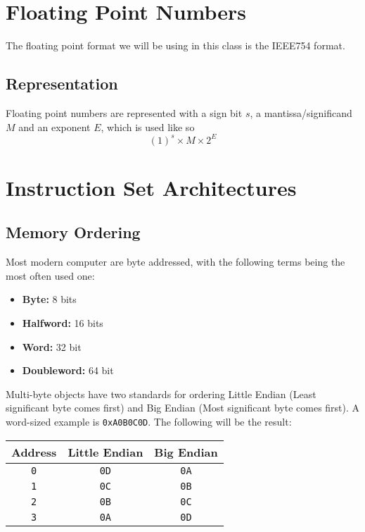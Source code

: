 \documentclass{article}
\theoremstyle{remark}
\begin{document}
\section{Floating Point Numbers}
The floating point format we will be using in this class is the IEEE754 format.

\subsection{Representation}
Floating point numbers are represented with a sign bit \(s\), a mantissa/significand \(M\) and an exponent \(E\), which is used like so
\[
    {\left(1\right)}^s \times M \times 2^E
\]
\newpage
\section{Instruction Set Architectures}
\subsection{Memory Ordering}
Most modern computer are byte addressed, with the following terms being the most often used one:
\begin{itemize}
    \item \textbf{Byte:} 8 bits
    \item \textbf{Halfword:} 16 bits
    \item \textbf{Word:} 32 bit
    \item \textbf{Doubleword:} 64 bit
\end{itemize}
Multi-byte objects have two standards for ordering Little Endian (Least significant byte comes first) and Big Endian (Most significant byte comes first). A word-sized example is \verb"0xA0B0C0D". The following will be the result:

\begin{table}[!htbp]
    \centering
    \begin{tabular}{ c c c }
        \toprule
        Address                 & Little Endian           & Big Endian              \\
        \midrule
        \verb"0"  & \verb"0D"  & \verb"0A"  \\
        \verb"1"  & \verb"0C"  & \verb"0B"  \\
        \verb"2"  & \verb"0B"  & \verb"0C" \\
        \verb"3" & \verb"0A" & \verb"0D" \\
        \bottomrule
    \end{tabular}
\end{table}
\end{document}
